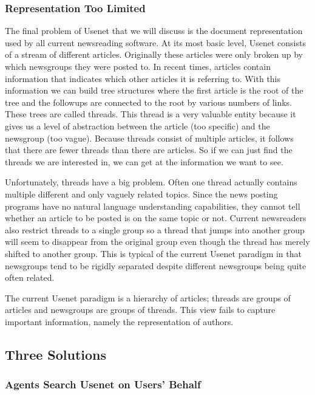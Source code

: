 \subsubsection{Representation Too Limited}

The final problem of Usenet that we will discuss is the document
representation used by all current newsreading software. At its most basic
level, Usenet consists of a stream of different articles. Originally these
articles were only broken up by which newsgroups they were posted to. In
recent times, articles contain information that indicates which other
articles it is referring to. With this information we can build tree
structures where the first article is the root of the tree and the followups
are connected to the root by various numbers of links. These trees are
called threads. This thread is a very valuable entity because it gives us a
level of abstraction between the article (too specific) and the newsgroup
(too vague). Because threads consist of multiple articles, it follows that
there are fewer threads than there are articles. So if we can just find the
threads we are interested in, we can get at the information we want to see.

Unfortunately, threads have a big problem. Often one thread actually contains
multiple different and only vaguely related topics. Since the news posting
programs have no natural language understanding capabilities, they cannot
tell whether an article to be posted is on the same topic or not. Current
newsreaders also restrict threads to a single group so a thread that jumps
into another group will seem to disappear from the original group even
though the thread has merely shifted to another group. This is typical of
the current Usenet paradigm in that newsgroups tend to be rigidly separated
despite different newsgroups being quite often related.

The current Usenet paradigm is a hierarchy of articles; threads are groups of
articles and newsgroups are groups of threads. This view fails to capture
important information, namely the representation of authors.

\subsection{Three Solutions}

\subsubsection{Agents Search Usenet on Users' Behalf}

